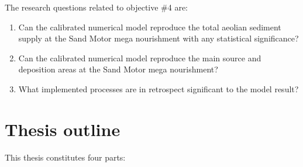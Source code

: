 \begin{description}
  \medskip

  The research questions related to objective \#4 are:

  \begin{enumerate}[{4.}1]
  \item \label{q:4.1} Can the calibrated numerical model reproduce the
    total aeolian sediment supply at the Sand Motor mega nourishment
    with any statistical significance?
  \item \label{q:4.2} Can the calibrated numerical model reproduce the
    main source and deposition areas at the Sand Motor mega
    nourishment?
  \item \label{q:4.4} What implemented processes are in retrospect
    significant to the model result?
  \end{enumerate}
\end{description}

\bigskip

\section{Thesis outline}

This thesis constitutes four parts:

